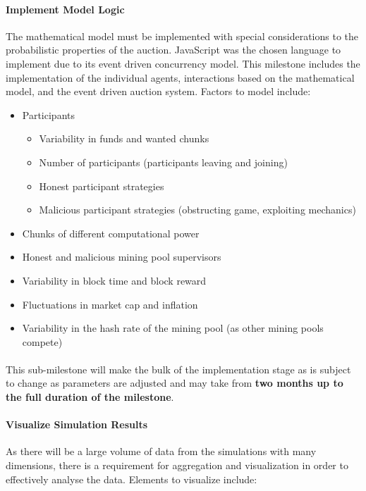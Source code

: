 \paragraph{Implement Model Logic} The mathematical model must be implemented with special considerations to the probabilistic properties of the auction. JavaScript was the chosen language to implement due to its event driven concurrency model. This milestone includes the implementation of the individual agents, interactions based on the mathematical model, and the event driven auction system. Factors to model include:

\begin{itemize}
  \item Participants
    \begin{itemize}
      \item Variability in funds and wanted chunks
      \item Number of participants (participants leaving and joining)
      \item Honest participant strategies
      \item Malicious participant strategies (obstructing game, exploiting mechanics)
    \end{itemize}
  \item Chunks of different computational power
  \item Honest and malicious mining pool supervisors
  \item Variability in block time and block reward
  \item Fluctuations in market cap and inflation
  \item Variability in the hash rate of the mining pool (as other mining pools compete)
\end{itemize}

\paragraph{} This sub-milestone will make the bulk of the implementation stage as is subject to change as parameters are adjusted and may take from \textbf{two months up to the full duration of the milestone}.

\paragraph{Visualize Simulation Results} As there will be a large volume of data from the simulations with many dimensions, there is a requirement for aggregation and visualization in order to effectively analyse the data. Elements to visualize include:

